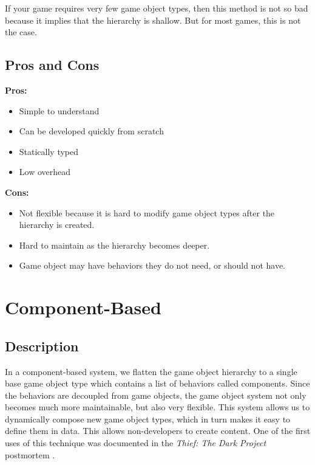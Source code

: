 \documentclass[
    phd,
    electronic,
    letterpaper,
    simplechapterheading,
    openany,
    parttop,
    lof,
]{byumsphd}
\begin{document}
If your game requires very few game object types, then this method is not so bad because it implies that the hierarchy is shallow. But for most games, this is not the case.


\subsection{Pros and Cons}

\begin{singlespace}

\begin{minipage}[t]{0.45\textwidth}
\textbf{Pros:}
\begin{itemize}
    \item Simple to understand
    \item Can be developed quickly from scratch
    \item Statically typed
    \item Low overhead
\end{itemize}\end{minipage}
\hfill \vrule \hfill
\begin{minipage}[t]{0.45\textwidth}
\textbf{Cons:}
\begin{itemize}
    \item Not flexible because it is hard to modify game object types after the hierarchy is created.
    \item Hard to maintain as the hierarchy becomes deeper.
    \item Game object may have behaviors they do not need, or should not have.
\end{itemize}\end{minipage}

\end{singlespace}

\pagebreak

\section{Component-Based}

\subsection{Description}

In a component-based system, we flatten the game object hierarchy to a single base game object type which contains a list of behaviors called components. Since the behaviors are decoupled from game objects, the game object system not only becomes much more maintainable, but also very flexible. This system allows us to dynamically compose new game object types, which in turn makes it easy to define them in data. This allows non-developers to create content. One of the first uses of this technique was documented in the \textit{Thief: The Dark Project} postmortem \cite{website:thief}.
\end{document}
